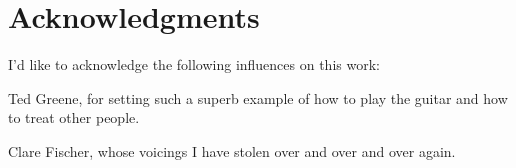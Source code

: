 \documentclass[12pt,pdftex]{report}
\newcommand{\authorname}{Ben Shelton}
\begin{document}
\newcommand{\achapter}[2]{
	\chapter{#1}
	\label{#2}
	\markright{\authorname \hfill Chapter \thechapter. #1 \hfill}
}

\pagebreak

\chapter*{Acknowledgments}

I'd like to acknowledge the following influences on this work:

Ted Greene, for setting such a superb example of how to play the guitar and how to treat other people.

Clare Fischer, whose voicings I have stolen over and over and over again.

\tableofcontents
\pagebreak






\end{document}
